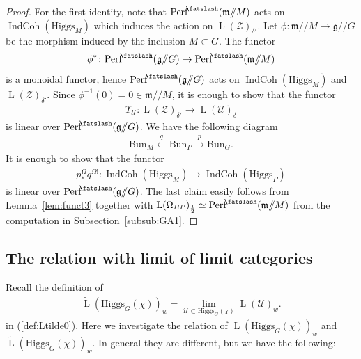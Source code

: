 \documentclass [11pt,oneside,a4paper,mathscr]{amsart}
\theoremstyle{definition}
\newcommand{\LL}{\operatorname{L}}
\newcommand{\fg}{\mathfrak{g}}
\newcommand{\fm}{\mathfrak{m}}
\newcommand{\IndCoh}{\operatorname{IndCoh}}
\newcommand{\shear}{{\mathbin{\mkern-6mu\fatslash}}}
\newcommand{\ssslash}{/\!\!/}
\newcommand{\Hig}{\mathrm{Higgs}}
\newcommand{\Bun}{\mathrm{Bun}}
\begin{document}
\begin{proof}
 For the first identity, note that 
 $\mathrm{Perf}^{\shear}(\fm\ssslash M)$ acts on 
 $\IndCoh(\Hig_M)$ which induces the action on 
 $\LL(\mathcal{Z})_{\delta'}$. 
 Let $\phi \colon \fm\ssslash M \to \fg\ssslash G$ be the morphism 
 induced by the inclusion $M\subset G$. The functor 
 \begin{align*}
     \phi^* \colon \mathrm{Perf}^{\shear}(\fg\ssslash G)\to \mathrm{Perf}^{\shear}(\fm\ssslash M)
 \end{align*}
 is a monoidal functor, hence $\mathrm{Perf}^{\shear}(\fg\ssslash G)$ acts on 
 $\IndCoh(\Hig_M)$ and $\LL(\mathcal{Z})_{\delta'}$.
 Since $\phi^{-1}(0)=0 \in \fm\ssslash M$, it
  is enough to show that the functor 
 \begin{align*}
     \Upsilon_{\mathcal{U}} \colon \LL(\mathcal{Z})_{\delta'} \to \LL(\mathcal{U})_{\delta}
 \end{align*}
 is linear over $\mathrm{Perf}^{\shear}(\fg\ssslash G)$. 
 We have the following diagram 
 \begin{align*}\Bun_M \stackrel{q}{\leftarrow} \Bun_P \stackrel{p}{\to} \Bun_G.
 \end{align*}
 It is enough to show that the functor 
 \begin{align*}
     p_{*}^{\Omega}q^{\Omega!} \colon \IndCoh(\Hig_M) \to \IndCoh(\Hig_P)
 \end{align*}
 is linear over $\mathrm{Perf}^{\shear}(\fg\ssslash G)$. The last claim easily follows from Lemma~\ref{lem:funct3} together with $\LL(\Omega_{BP})_{\frac{1}{2}}\simeq \mathrm{Perf}^{\shear}(\fm\ssslash M)$ from the computation in Subsection~\ref{subsub:GA1}.
\end{proof}


\subsection{The relation with limit of limit categories}\label{subsec:Ltilde}
Recall the definition of 
\begin{align*}\widetilde{\LL}(\Hig_{G}(\chi))_w=\lim_{\mathcal{U}\subset \Hig_G(\chi)}
\LL(\mathcal{U})_w.
\end{align*}
in 
(\ref{def:Ltilde0}). 
Here we investigate the relation of $\LL(\Hig_G(\chi))_w$ and $\widetilde{\LL}(\Hig_G(\chi))_w$.
In general they are different, but we have the following: 
\end{document}
